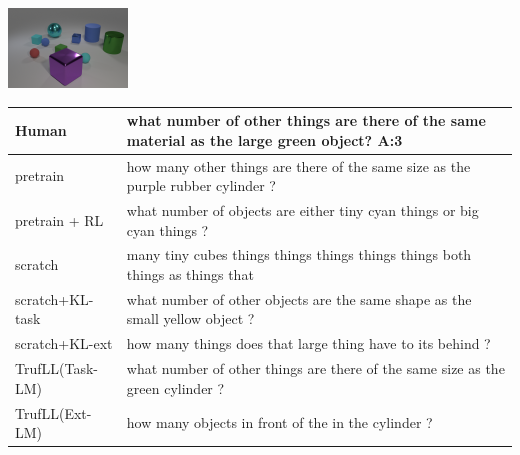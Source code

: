 \documentclass{article}
\newcommand{\algo}{TrufLL\xspace}
\begin{document}
\begin{table}[h!]
  \begin{minipage}{0.2\linewidth}
        \includegraphics[width=120px]{./CLEVR_val_004952.png}
	\end{minipage}
	 \hspace{1.2cm}
	\begin{minipage}{0.80\linewidth}
		\scriptsize
		\begin{tabular}{ll}
			Human           & what number of other things are there of the same material as the large green object?  \quad \textbf{A:3} \\
			\midrule
			pretrain        & how many other things are there of the same size as the purple rubber cylinder ? \\
		    pretrain + RL   & what number of objects are either tiny cyan things or big cyan things ? \\ \midrule
			scratch         & many tiny cubes things things things things things both things as things that  \\
			scratch+KL-task & what number of other objects are the same shape as the small yellow object ? \\
			scratch+KL-ext  & how many things does that large thing have to its behind ?\\ \midrule
			\algo(Task-LM) & what number of other things are there of the same size as the green cylinder ? \\
			\algo(Ext-LM)   & how many objects in front of the in the cylinder ? \\
			\bottomrule
		\end{tabular}
	\end{minipage}
	\vspace{1mm}	


\end{table}
\end{document}
